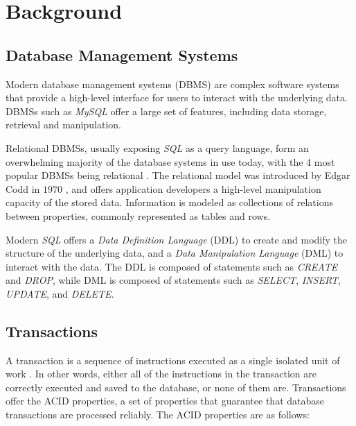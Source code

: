 \chapter{Background}

 
\section{Database Management Systems}

Modern database management systems (DBMS) are complex software systems that provide a high-level interface for users to interact with the underlying data. DBMSs such as \textit{MySQL} \cite{mysqlwebpage} offer a large set of features, including data storage, retrieval and manipulation.

Relational DBMSs, usually exposing \textit{SQL} as a query language, form an overwhelming majority of the database systems in use today, with the 4 most popular DBMSs being relational \cite{akhtar2023popularity}. The relational model was introduced by Edgar Codd in $1970$ \cite{codd1970relational}, and offers application developers a high-level manipulation capacity of the stored data. Information is modeled as collections of relations between properties, commonly represented as tables and rows.

Modern \textit{SQL} offers a \textit{Data Definition Language} (DDL) to create and modify the structure of the underlying data, and a \textit{Data Manipulation Language} (DML) to interact with the data. The DDL is composed of statements such as \textit{CREATE} and \textit{DROP}, while DML is composed of statements such as \textit{SELECT}, \textit{INSERT}, \textit{UPDATE}, and \textit{DELETE}.

\section{Transactions}

A transaction is a sequence of instructions executed as a single isolated unit of work \cite{gray1981transaction}. In other words, either all of the instructions in the transaction are correctly executed and saved to the database, or none of them are. Transactions offer the ACID properties, a set of properties that guarantee that database transactions are processed reliably. The ACID properties are as follows:

